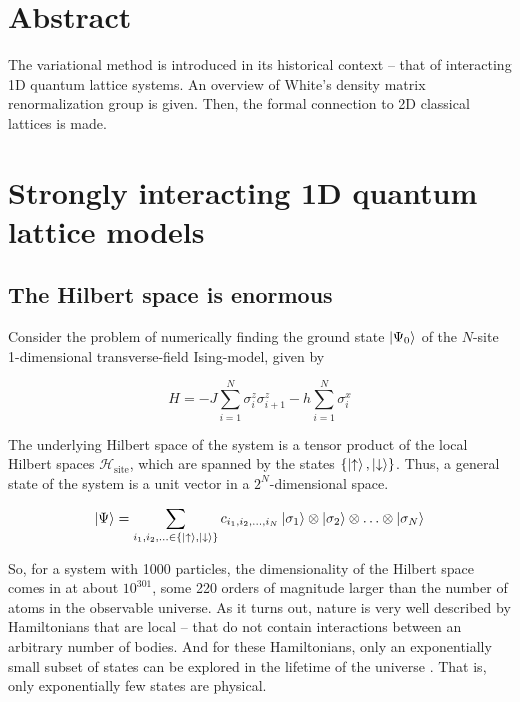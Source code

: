 \section{Abstract}

The variational method is introduced in its historical context -- that of
interacting 1D quantum lattice systems. An overview of White's density
matrix renormalization group \cite{white1992density} is given. Then, the
formal connection to 2D classical lattices is made.

\section{Strongly interacting 1D quantum lattice models}

\subsection{The Hilbert space is enormous}

Consider the problem of numerically finding the ground state $\ket{\Psi_0}$ of the
$N$-site 1-dimensional transverse-field Ising-model, given by

\begin{equation} 
  H = -J \sum_{i = 1}^{N} \sigma_{i}^{z}\sigma_{i+1}^{z}
  - h \sum_{i=1}^{N} \sigma_{i}^{x}
\end{equation}

The underlying Hilbert space of the system is a tensor product of the
local Hilbert spaces $\mathcal{H}_{\text{site}}$, which are spanned by the
states $\{\ket{\uparrow}, \ket{\downarrow}\}$. Thus, a general state of the system is a unit vector in
a $2^N$-dimensional space.

\begin{equation}
  \ket{\Psi} = \sum_{i_1, i_2, \ldots \in \{\ket{\uparrow}, \ket{\downarrow}\}} c_{i_1, i_2, \ldots, i_N} \ket{\sigma_1} \otimes \ket{\sigma_2} \otimes \ldots \otimes \ket{\sigma_N}
\end{equation}

So, for a system with 1000 particles, the dimensionality of the Hilbert
space comes in at about $10^301$, some 220 orders of magnitude larger than
the number of atoms in the observable universe. As it turns out, nature is
very well described by Hamiltonians that are local -- that do not contain
interactions between an arbitrary number of bodies. And for these
Hamiltonians, only an exponentially small subset of states can be explored
in the lifetime of the universe \cite{poulin2011quantum}. That is, only
exponentially few states are physical. 



